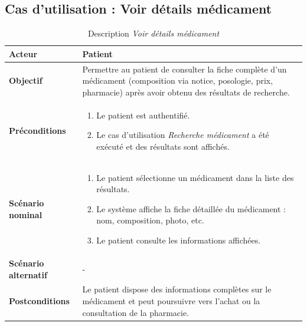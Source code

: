 \documentclass[12pt,a4paper]{report}
\begin{document}
\subsection*{Cas d'utilisation : Voir détails médicament}

\begin{table}[H]
    \centering
    \begin{tabular}{|p{4cm}|p{9cm}|}
        \hline
        \textbf{Acteur} & Patient \\
        \hline
        \textbf{Objectif} & Permettre au patient de consulter la fiche complète d'un médicament (composition via notice, posologie, prix, pharmacie) après avoir obtenu des résultats de recherche. \\
        \hline
        \textbf{Préconditions} &
        \begin{enumerate}
            \item Le patient est authentifié.
            \item Le cas d'utilisation \textit{Recherche médicament} a été exécuté et des résultats sont affichés.
        \end{enumerate} \\
        \hline
        \textbf{Scénario nominal} &
        \begin{enumerate}
            \item Le patient sélectionne un médicament dans la liste des résultats.
            \item Le système affiche la fiche détaillée du médicament : nom, composition, photo, etc.
            \item Le patient consulte les informations affichées.
        \end{enumerate} \\
        \hline
        \textbf{Scénario alternatif} & - \\
        \hline
        \textbf{Postconditions} & Le patient dispose des informations complètes sur le médicament et peut poursuivre vers l'achat ou la consultation de la pharmacie. \\
        \hline
    \end{tabular}
    \caption{Description \textit{Voir détails médicament}}
\end{table}

\end{document}
